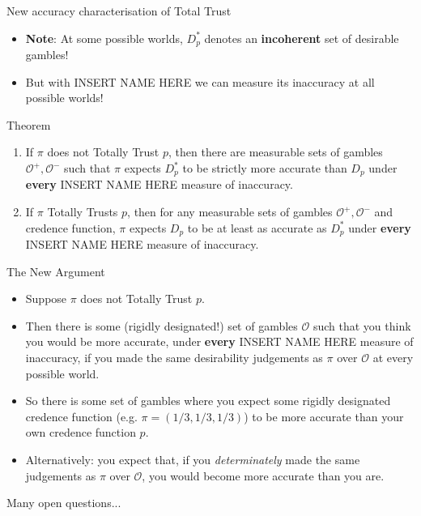 \documentclass[aspectratio=169, dvipsnames]{beamer}
\newcommand{\Oset}{\mathcal{O}}
\begin{document}
\begin{frame}{New accuracy characterisation of Total Trust}
  \begin{itemize}
  \item \textbf{Note}: At some possible worlds, $D_p^*$ denotes an \alert{\textbf{incoherent}} set of desirable gambles!
  \item But with INSERT NAME HERE we can measure its inaccuracy at all possible worlds!
  \end{itemize}
  \begin{block}{Theorem}
    \begin{enumerate}
      \item If $\pi$ does not Totally Trust $p$, then there are measurable sets of gambles $\Oset^+, \Oset^-$ such that
        $\pi$ expects $D_p^*$ to be strictly more accurate than $D_p$ under \alert{\textbf{every}}
        INSERT NAME HERE measure of inaccuracy.
      \item If $\pi$ Totally Trusts $p$, then for any measurable sets of gambles $\Oset^+, \Oset^-$ and credence function, $\pi$ expects $D_p$
        to be at least as accurate as $D_p^*$ under \alert{\textbf{every}} INSERT NAME HERE measure of inaccuracy.
    \end{enumerate}
  \end{block}
\end{frame}

\begin{frame}{The New Argument}
  \begin{itemize}
  \item Suppose $\pi$ does not Totally Trust $p$.
  \item Then there is some (rigidly designated!) set of gambles $\Oset$ such that you think you would be more accurate,
    under \textbf{\alert{every}} INSERT NAME HERE measure of inaccuracy, if you made the same desirability judgements
    as $\pi$ over $\Oset$ at every possible world.
  \item So there is some set of gambles where you expect some rigidly designated credence function (e.g. $\pi=(1/3, 1/3, 1/3)$)
    to be more accurate than your own credence function $p$.
  \item Alternatively: you expect that, if you \textit{determinately} made the same judgements as $\pi$ over $\Oset$, you
    would become more accurate than you are.
  \end{itemize}
\end{frame}

\begin{frame}{Many open questions...}
  
\end{frame}
\end{document}
